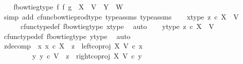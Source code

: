 \begin{isabellebody}
\isanewline
\ \ \isamarkupfalse%
\ f{\isacharunderscore}{\kern0pt}bowtie{\isacharunderscore}{\kern0pt}g{\isacharunderscore}{\kern0pt}type{\isacharcolon}{\kern0pt}\ {\isachardoublequoteopen}{\isacharparenleft}{\kern0pt}f\ {\isasymbowtie}\isactrlsub f\ g{\isacharparenright}{\kern0pt}\ {\isacharcolon}{\kern0pt}\ X\ {\isasymCoprod}\ V\ {\isasymrightarrow}\ Y\ {\isasymCoprod}\ W{\isachardoublequoteclose}\isanewline
\ \ \ \ \isamarkupfalse%
\ {\isacharparenleft}{\kern0pt}simp\ add{\isacharcolon}{\kern0pt}\ cfunc{\isacharunderscore}{\kern0pt}bowtie{\isacharunderscore}{\kern0pt}prod{\isacharunderscore}{\kern0pt}type\ type{\isacharunderscore}{\kern0pt}assms{\isacharparenleft}{\kern0pt}{}{\isacharparenright}{\kern0pt}\ type{\isacharunderscore}{\kern0pt}assms{\isacharparenleft}{\kern0pt}{}{\isacharparenright}{\kern0pt}{\isacharparenright}{\kern0pt}\isanewline
\isanewline
\ \ \isamarkupfalse%
\ x{\isacharunderscore}{\kern0pt}type{}{\isacharcolon}{\kern0pt}\ {\isachardoublequoteopen}z{}\ {\isasymin}\isactrlsub c\ X\ {\isasymCoprod}\ V{\isachardoublequoteclose}\isanewline
\ \ \ \ \isamarkupfalse%
\ cfunc{\isacharunderscore}{\kern0pt}type{\isacharunderscore}{\kern0pt}def\ f{\isacharunderscore}{\kern0pt}bowtie{\isacharunderscore}{\kern0pt}g{\isacharunderscore}{\kern0pt}type\ x{\isacharunderscore}{\kern0pt}type\ \isamarkupfalse%
\ auto\isanewline
\ \ \isamarkupfalse%
\ y{\isacharunderscore}{\kern0pt}type{}{\isacharcolon}{\kern0pt}\ {\isachardoublequoteopen}z{}\ {\isasymin}\isactrlsub c\ X\ {\isasymCoprod}\ V{\isachardoublequoteclose}\isanewline
\ \ \ \ \isamarkupfalse%
\ cfunc{\isacharunderscore}{\kern0pt}type{\isacharunderscore}{\kern0pt}def\ f{\isacharunderscore}{\kern0pt}bowtie{\isacharunderscore}{\kern0pt}g{\isacharunderscore}{\kern0pt}type\ y{\isacharunderscore}{\kern0pt}type\ \isamarkupfalse%
\ auto\isanewline
\isanewline
\ \ \isamarkupfalse%
\ z{}{\isacharunderscore}{\kern0pt}decomp{\isacharcolon}{\kern0pt}\ {\isachardoublequoteopen}{\isacharparenleft}{\kern0pt}{\isasymexists}\ x{}{\isachardot}{\kern0pt}\ {\isacharparenleft}{\kern0pt}x{}\ {\isasymin}\isactrlsub c\ X\ {\isasymand}\ z{}\ {\isacharequal}{\kern0pt}\ left{\isacharunderscore}{\kern0pt}coproj\ X\ V\ {\isasymcirc}\isactrlsub c\ x{}{\isacharparenright}{\kern0pt}{\isacharparenright}{\kern0pt}\isanewline
\ \ \ \ \ \ {\isasymor}\ \ {\isacharparenleft}{\kern0pt}{\isasymexists}\ y{}{\isachardot}{\kern0pt}\ {\isacharparenleft}{\kern0pt}y{}\ {\isasymin}\isactrlsub c\ V\ {\isasymand}\ z{}\ {\isacharequal}{\kern0pt}\ right{\isacharunderscore}{\kern0pt}coproj\ X\ V\ {\isasymcirc}\isactrlsub c\ y{}{\isacharparenright}{\kern0pt}{\isacharparenright}{\kern0pt}{\isachardoublequoteclose}\isanewline

\end{isabellebody}
